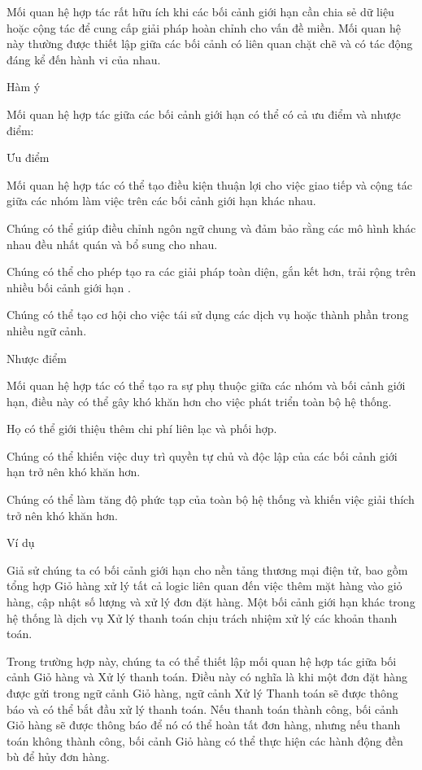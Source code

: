 Mối quan hệ hợp tác rất hữu ích khi các bối cảnh giới hạn cần chia sẻ dữ liệu hoặc cộng tác để cung cấp giải pháp hoàn chỉnh cho vấn đề miền. Mối quan hệ này thường được thiết lập giữa các bối cảnh có liên quan chặt chẽ và có tác động đáng kể đến hành vi của nhau.

Hàm ý

Mối quan hệ hợp tác giữa các bối cảnh giới hạn có thể có cả ưu điểm và nhược điểm:

Ưu điểm

Mối quan hệ hợp tác có thể tạo điều kiện thuận lợi cho việc giao tiếp và cộng tác giữa các nhóm làm việc trên các bối cảnh giới hạn khác nhau.

Chúng có thể giúp điều chỉnh ngôn ngữ chung và đảm bảo rằng các mô hình khác nhau đều nhất quán và bổ sung cho nhau.

Chúng có thể cho phép tạo ra các giải pháp toàn diện, gắn kết hơn, trải rộng trên nhiều bối cảnh giới hạn .

Chúng có thể tạo cơ hội cho việc tái sử dụng các dịch vụ hoặc thành phần trong nhiều ngữ cảnh.

Nhược điểm

Mối quan hệ hợp tác có thể tạo ra sự phụ thuộc giữa các nhóm và bối cảnh giới hạn, điều này có thể gây khó khăn hơn cho việc phát triển toàn bộ hệ thống.

Họ có thể giới thiệu thêm chi phí liên lạc và phối hợp.

Chúng có thể khiến việc duy trì quyền tự chủ và độc lập của các bối cảnh giới hạn trở nên khó khăn hơn.

Chúng có thể làm tăng độ phức tạp của toàn bộ hệ thống và khiến việc giải thích trở nên khó khăn hơn.

Ví dụ

Giả sử chúng ta có bối cảnh giới hạn cho nền tảng thương mại điện tử, bao gồm tổng hợp Giỏ hàng xử lý tất cả logic liên quan đến việc thêm mặt hàng vào giỏ hàng, cập nhật số lượng và xử lý đơn đặt hàng. Một bối cảnh giới hạn khác trong hệ thống là dịch vụ Xử lý thanh toán chịu trách nhiệm xử lý các khoản thanh toán.

Trong trường hợp này, chúng ta có thể thiết lập mối quan hệ hợp tác giữa bối cảnh Giỏ hàng và Xử lý thanh toán. Điều này có nghĩa là khi một đơn đặt hàng được gửi trong ngữ cảnh Giỏ hàng, ngữ cảnh Xử lý Thanh toán sẽ được thông báo và có thể bắt đầu xử lý thanh toán. Nếu thanh toán thành công, bối cảnh Giỏ hàng sẽ được thông báo để nó có thể hoàn tất đơn hàng, nhưng nếu thanh toán không thành công, bối cảnh Giỏ hàng có thể thực hiện các hành động đền bù để hủy đơn hàng.

